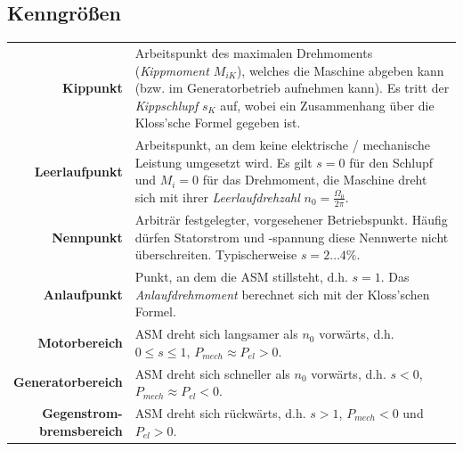 \documentclass[a4paper, 11pt]{article}
\begin{document}
\subsection*{Kenngrößen}
\begin{center}
\bgroup
\begin{longtable}{r p{12cm}}
	\textbf{Kippunkt} & Arbeitspunkt des maximalen Drehmoments (\textit{Kippmoment $M_{iK}$}), welches die Maschine abgeben kann (bzw. im Generatorbetrieb aufnehmen kann). Es tritt der \textit{Kippschlupf} $s_K$ auf, wobei ein Zusammenhang über die Kloss'sche Formel gegeben ist. \\
	\textbf{Leerlaufpunkt} & Arbeitspunkt, an dem keine elektrische / mechanische Leistung umgesetzt wird. Es gilt $s = 0$ für den Schlupf und $M_i = 0$ für das Drehmoment, die Maschine dreht sich mit ihrer \textit{Leerlaufdrehzahl} $n_0 = \frac{\Omega_0}{2\pi}$. \\
	\textbf{Nennpunkt} & Arbiträr festgelegter, vorgesehener Betriebspunkt. Häufig dürfen Statorstrom und -spannung diese Nennwerte nicht überschreiten. Typischerweise $s = 2\dots4\%$. \\
	\textbf{Anlaufpunkt} & Punkt, an dem die ASM stillsteht, d.h. $s = 1$. Das \textit{Anlaufdrehmoment} berechnet sich mit der Kloss'schen Formel. \\
	\textbf{Motorbereich} & ASM dreht sich langsamer als $n_0$ vorwärts, d.h. $0 \leq s \leq 1$, $P_{mech} \approx P_{el} > 0$. \\
	\textbf{Generatorbereich} & ASM dreht sich schneller als $n_0$ vorwärts, d.h. $s < 0$, $P_{mech} \approx P_{el} < 0$. \\
	\pbox{20cm}{\textbf{Gegenstrom-} \\ \textbf{bremsbereich}} & ASM dreht sich rückwärts, d.h. $s > 1$, $P_{mech} < 0$ und $P_{el} > 0$.
\end{longtable}
\egroup
\end{center}
\end{document}
